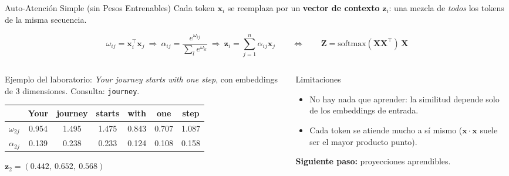\documentclass[aspectratio=169, 10pt]{beamer}
\newcommand{\softmax}{\mathrm{softmax}}
\newcommand{\formula}[1]{%
	\begin{tcolorbox}[colback=UCMBlue!8, colframe=UCMBlue, arc=4pt,
		boxsep=2pt, left=6pt, right=6pt, top=3pt, bottom=3pt]
		#1
	\end{tcolorbox}
}
\begin{document}
\begin{frame}{Auto-Atenci\'on Simple (sin Pesos Entrenables)}
	Cada token $\mathbf{x}_i$ se reemplaza por un \textbf{vector de contexto} $\mathbf{z}_i$: una mezcla de \emph{todos} los tokens de la misma secuencia.
	\formula{
		\small
		\[
		\omega_{ij}=\mathbf{x}_i^\top\mathbf{x}_j
		\ \Rightarrow\
		\alpha_{ij}=\frac{e^{\omega_{ij}}}{\sum_{l}e^{\omega_{il}}}
		\ \Rightarrow\
		\mathbf{z}_i=\sum_{j=1}^{n}\alpha_{ij}\mathbf{x}_j
		\qquad\Longleftrightarrow\qquad
		\mathbf{Z}=\softmax(\mathbf{X}\mathbf{X}^\top)\,\mathbf{X}
		\]
	}
	\vspace{-0.2cm}
	\begin{columns}[T]
		\begin{column}{0.5\textwidth}
			\small
			Ejemplo del laboratorio: \emph{Your journey starts with one step}, con embeddings de 3 dimensiones. Consulta: \texttt{journey}.
			\begin{center}
				\scriptsize
				\begin{tabular}{lcccccc}
					\toprule
					& Your & journey & starts & with & one & step\\
					\midrule
					$\omega_{2j}$ & 0.954 & 1.495 & 1.475 & 0.843 & 0.707 & 1.087\\
					$\alpha_{2j}$ & 0.139 & 0.238 & 0.233 & 0.124 & 0.108 & 0.158\\
					\bottomrule
				\end{tabular}
			\end{center}
			$\mathbf{z}_2=(0.442,\ 0.652,\ 0.568)$
		\end{column}
		\begin{column}{0.47\textwidth}
			\begin{alertblock}{Limitaciones}
				\small
				\begin{itemize}
					\item No hay nada que aprender: la similitud depende solo de los embeddings de entrada.
					\item Cada token se atiende mucho a s\'i mismo ($\mathbf{x}\cdot\mathbf{x}$ suele ser el mayor producto punto).
				\end{itemize}
			\end{alertblock}
			\small
			\textbf{Siguiente paso:} proyecciones aprendibles.
		\end{column}
	\end{columns}
\end{frame}
\end{document}
